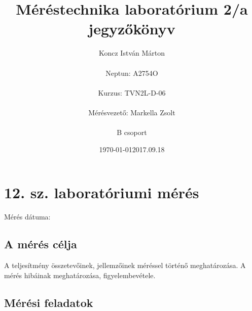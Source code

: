 \documentclass[10pt,a4paper]{article}
\begin{document}
\title{Méréstechnika laboratórium 2/a jegyzőkönyv}
\author{Koncz István Márton\\\\Neptun: A2754O\\\\Kurzus: TVN2L-D-06\\\\Mérésvezető: Markella Zsolt\\\\B csoport}
\date{\today}
\maketitle
\newpage
\section{12. sz. laboratóriumi mérés}
	Mérés dátuma:\date{2017.09.18}
	\subsection{A mérés célja}
	A teljesítmény összetevőinek, jellemzőinek méréssel történő meghatározása.
A mérés hibáinak meghatározása, figyelembevétele.
	\subsection{Mérési feladatok}
\end{document}
